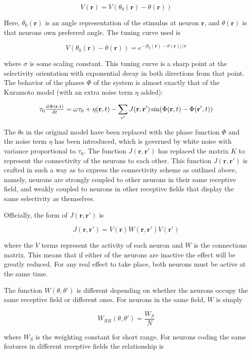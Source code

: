 \documentclass[12pt]{article}
\begin{document}
$$ V(\mathbf{r})=V(\theta_0(\mathbf{r})-\theta(\mathbf{r})) $$

Here, $\theta_0(\mathbf{r})$ is an angle representation of the stimulus at neuron $\mathbf{r}$, and $\theta(\mathbf{r})$ is that neurons own preferred angle.  The tuning curve used is 

$$ V(\theta_0(\mathbf{r})-\theta(\mathbf{r}))=e^{-|\theta_0(\mathbf{r})-\theta(\mathbf{r})|/\sigma} $$

where $\sigma$ is some scaling constant.  This tuning curve is a sharp point at the selectivity orientation with exponential decay in both directions from that point.  The behavior of the phases $\Phi$ of the system is almost exactly that of the Kuramoto model (with an extra noise term $\eta$ added):

$$ \tau_0\od{\Phi(\mathbf{r},t)}{t}=\omega\tau_0+\eta(\mathbf{r},t)-\sum\limits_{r'}J(\mathbf{r},\mathbf{r}')\sin(\Phi(\mathbf{r},t)-\Phi(\mathbf{r'},t)) $$

The $\theta$s in the original model have been replaced with the phase function $\Phi$ and the noise term $\eta$ has been introduced, which is governed by white noise with variance proportional to $\tau_0$.  The function $J(\mathbf{r},\mathbf{r'})$ has replaced the matrix $K$ to represent the connectivity of the neurons to each other.  This function $J(\mathbf{r},\mathbf{r'})$ is crafted in such a way as to express the connectivity scheme as outlined above, namely, neurons are strongly coupled to other neurons in their same receptive field, and weakly coupled to neurons in other receptive fields that display the same selectivity as themselves.  

Officially, the form of $J(\mathbf{r},\mathbf{r'})$ is

$$ J(\mathbf{r},\mathbf{r'})=V(\mathbf{r})W(\mathbf{r},\mathbf{r'})V(\mathbf{r'}) $$

where the $V$ terms represent the activity of each neuron and $W$ is the connections matrix.  This means that if either of the neurons are inactive the effect will be greatly reduced.  For any real effect to take place, both neurons must be active at the same time.  

The function $W(\theta,\theta')$ is different depending on whether the neurons occupy the same receptive field or different ones.  For neurons in the same field, $W$ is simply

$$ W_{RR}(\theta,\theta')=\frac{W_S}{N} $$

where $W_S$ is the weighting constant for short range.  For neurons coding the same features in different receptive fields the relationship is
\end{document}
